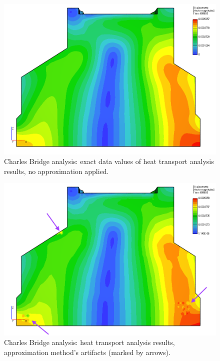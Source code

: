 \begin{figure}[H]
  \centering
  \includegraphics[width=\textwidth]{figures/chapter-approximation/charles-bridge-exact-data-values}
  \decoRule
  \caption[Exact data values of heat transport analysis results.]{Charles Bridge analysis: exact data values of heat transport analysis results, no approximation applied.}
  \label{fig:charles-bridge-exact-data-values}
\end{figure}

\begin{figure}[H]
  \centering
  \includegraphics[width=\textwidth]{figures/chapter-approximation/charles-bridge-approximation-method-artifacts}
  \decoRule
  \caption[Approximation method's artifacts.]{Charles Bridge analysis: heat transport analysis results, approximation method's artifacts (marked by arrows).}
  \label{fig:charles-bridge-approximation-method-artifacts}
\end{figure}

